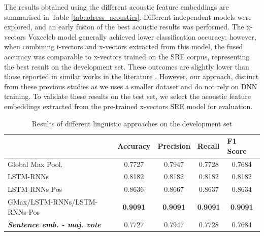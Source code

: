 The results obtained using the different acoustic feature embeddings are summarised in Table \ref{tab:adress_acoustics}. Different independent models were explored, and an early fusion of the best acoustic results was performed. The x-vectors Voxceleb model generally achieved lower classification accuracy; however, when combining i-vectors and x-vectors extracted from this model, the fused accuracy was comparable to x-vectors trained on the SRE corpus, representing the best result on the development set. These outcomes are slightly lower than those reported in similar works in the literature \cite{warnita18_interspeech,zargarbashi2019multi}. However, our approach, distinct from these previous studies as we uses a smaller dataset and do not rely on DNN training. To validate these results on the test set, we select the acoustic feature embeddings extracted from the pre-trained x-vectors SRE model for evaluation.
\begin{table}[t]
  \begin{tabular}{lcccc}
  \hline
& \multicolumn{1}{l}{\textbf{Accuracy}} & \multicolumn{1}{l}{\textbf{Precision}} & \multicolumn{1}{l}{\textbf{Recall}} & \multicolumn{1}{l}{\textbf{F1 Score}} \\ \hline
  Global Max Pool. & 0.7727                               & 0.7947                                & 0.7728                             & 0.7684                               \\
  LSTM-RNNs        & 0.8182                               & 0.8182                                & 0.8182                             & 0.8182                               \\
  LSTM-RNNs Pos    & 0.8636                               & 0.8667                                & 0.8637                             & 0.8634                               \\
  GMax/LSTM-RNNs/LSTM-RNNs-Pos                   & \textbf{0.9091}                               & \textbf{0.9091}                                & \textbf{0.9091}                             & \textbf{0.9091}  \\  
  \textit{\textbf{Sentence emb. - maj. vote}}                    & 0.7727                               &0.7947                & 0.7728                           & 0.7684
  \\ \hline
  \end{tabular}
  \caption{Results of different linguistic approaches on the development set}
  \label{tab:res_dev_ling}
  \end{table}


